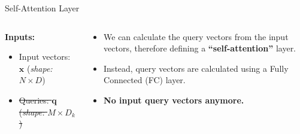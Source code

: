 \documentclass[serif, aspectratio=169]{beamer}
\begin{document}
\begin{frame}{Self-Attention Layer}
\begin{columns}
\begin{column}{0.44\textwidth}
				\textbf{Inputs:}
				\begin{itemize}
					\item Input vectors: $\mathbf{x}$ (\textit{shape: } $N \times D$)
					\item \st{Queries: $\mathbf{q}$ (\textit{shape: } $M \times D_k$)}
				\end{itemize}
			\end{column}
			
			\begin{column}{0.35\textwidth}
				\begin{itemize}
					\item We can calculate the query vectors from the input vectors, therefore defining a \textbf{“self-attention”} layer.
					\item Instead, query vectors are calculated using a Fully Connected (FC) layer.
					\item \textbf{No input query vectors anymore.}
				\end{itemize}
				
			\end{column}
		\end{columns}
\vspace{3pt}
\vfill
{}
\end{frame}
\end{document}
